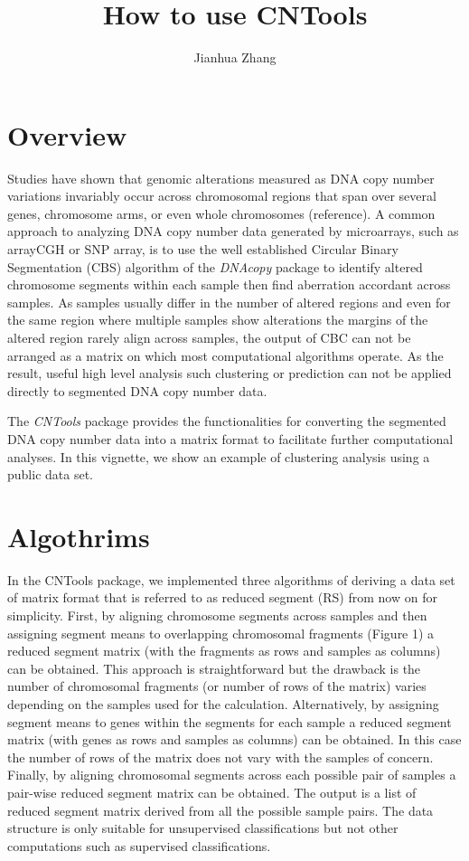 \documentclass[12pt]{article}
\newcommand{\Rpackage}[1]{{\textit{#1}}}
\begin{document}
\author{Jianhua Zhang}

\title{How to use CNTools}

\maketitle

\section*{Overview}

Studies have shown that genomic alterations measured as DNA copy number variations invariably occur across chromosomal regions that span over several genes, chromosome arms, or even whole chromosomes (reference). A common approach to analyzing DNA copy number data generated by microarrays, such as arrayCGH or SNP array, is to use the well established Circular Binary Segmentation (CBS) algorithm of the \Rpackage{DNAcopy} package to identify altered chromosome segments within each sample then find aberration accordant across samples. As samples usually differ in the number of altered regions and even for the same region where multiple samples show alterations the margins of the altered region rarely align across samples, the output of CBC can not be arranged as a matrix on which most computational algorithms operate. As the result, useful high level analysis such clustering or prediction can not be applied directly to segmented DNA copy number data.

The \Rpackage{CNTools} package provides the functionalities for converting the segmented DNA copy number data into a matrix format to facilitate further computational analyses. In this vignette, we show an example of clustering analysis using a public data set.  

\section*{Algothrims}

In the CNTools package, we implemented three algorithms of deriving a data set of matrix format that is referred to as reduced segment (RS) from now on for simplicity. First, by aligning chromosome segments across samples and then assigning segment means to overlapping chromosomal fragments (Figure 1) a reduced segment matrix (with the fragments as rows and samples as columns) can be obtained. This approach is straightforward but the drawback is the number of chromosomal fragments (or number of rows of the matrix) varies depending on the samples used for the calculation. Alternatively, by assigning segment means to genes within the segments for each sample a reduced segment matrix (with genes as rows and samples as columns) can be obtained. In this case the number of rows of the matrix does not vary with the samples of concern. Finally, by aligning chromosomal segments across each possible pair of samples a pair-wise reduced segment matrix can be obtained. The output is a list of reduced segment matrix derived from all the possible sample pairs. The data structure is only suitable for unsupervised classifications but not other computations such as supervised classifications.   
\end{document}
